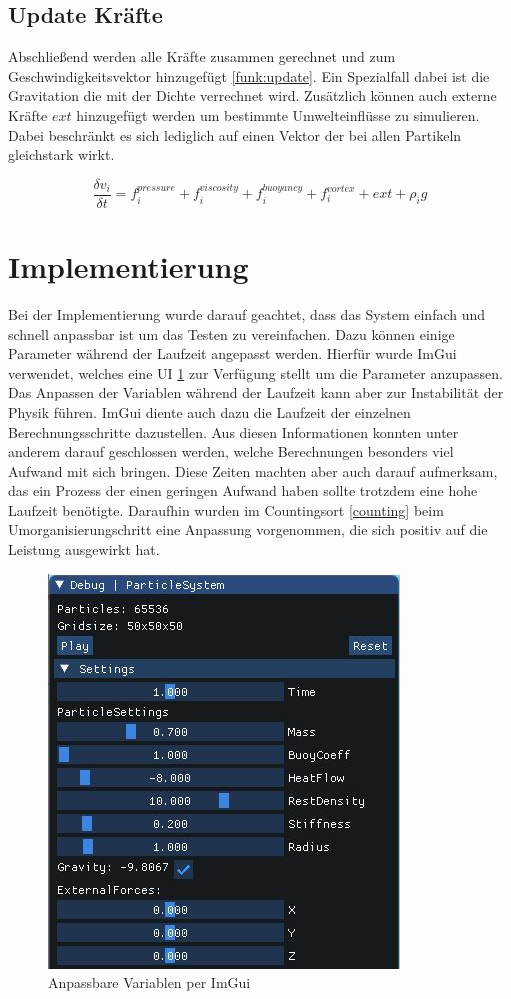 \documentclass[intern,palatino]{cgBA}
\begin{document}

\subsection{Update Kräfte}\label{kräfte}

Abschließend werden alle Kräfte zusammen gerechnet und zum Geschwindigkeitsvektor hinzugefügt \ref{funk:update}. Ein Spezialfall dabei ist die Gravitation die mit der Dichte verrechnet wird. Zusätzlich können auch externe Kräfte $ext$ hinzugefügt werden um bestimmte Umwelteinflüsse zu simulieren. Dabei beschränkt es sich lediglich auf einen Vektor der bei allen Partikeln gleichstark wirkt.
\newline

\begin{equation}\label{funk:update}
\frac{\delta v_i}{\delta t}  = f^{pressure}_i + f^{viscosity}_i + f^{buoyancy}_i + f^{vortex}_i + ext + \rho_i g
\end{equation}


\section{Implementierung}\label{imp}

Bei der Implementierung wurde darauf geachtet, dass das System einfach und schnell anpassbar ist um das Testen zu vereinfachen.
Dazu können einige Parameter während der Laufzeit angepasst werden. Hierfür wurde ImGui \cite{ocornut} verwendet, welches eine UI \ref{img:ext} zur Verfügung stellt um die Parameter anzupassen.
Das Anpassen der Variablen während der Laufzeit kann aber zur Instabilität der Physik führen.
\newline
ImGui diente auch dazu die Laufzeit der einzelnen Berechnungsschritte dazustellen. Aus diesen Informationen konnten unter anderem darauf geschlossen werden, welche Berechnungen besonders viel Aufwand mit sich bringen. Diese Zeiten machten aber auch darauf aufmerksam, das ein Prozess der einen geringen Aufwand haben sollte trotzdem eine hohe Laufzeit benötigte. Daraufhin wurden im Countingsort \ref{counting} beim Umorganisierungschritt eine Anpassung vorgenommen, die sich positiv auf die Leistung ausgewirkt hat.

\begin{figure}[H]
	\centering
	\includegraphics[width=0.35\columnwidth]{Bilder/external.jpg}
	\caption{Anpassbare Variablen per ImGui}
	\label{img:ext}
\end{figure}
\end{document}
